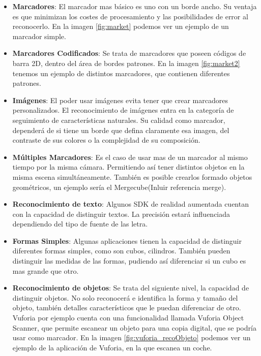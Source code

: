 \begin{itemize}
	\item \textbf{Marcadores}: El marcador mas básico es uno con un borde ancho. Su ventaja es que minimizan los costes de procesamiento y las posibilidades de error al reconocerlo. En la imagen \ref{fig:market} podemos ver un ejemplo de un marcador simple.\\		
	\item \textbf{Marcadores Codificados}:
	Se trata de marcadores que poseen códigos de barra 2D, dentro del área de bordes patrones. En la imagen \ref{fig:market2} tenemos un ejemplo de distintos marcadores, que contienen diferentes patrones.
	\item \textbf{Imágenes}:		
	El poder usar imágenes evita tener que crear marcadores personalizados. El reconocimiento de imágenes entra en la categoría de seguimiento de características naturales. Su calidad como marcador, dependerá de si tiene un borde que defina claramente esa imagen, del contraste de sus colores o la complejidad de su composición.
	\item \textbf{Múltiples Marcadores}:
	Es el caso de usar mas de un marcador al mismo tiempo por la misma cámara. Permitiendo así tener distintos objetos en la misma escena simultáneamente. También es posible crearlos formado objetos geométricos, un ejemplo sería el Mergecube(Inluir referencia merge).
	\item \textbf{Reconocimiento de texto}:
	Algunos SDK de realidad aumentada cuentan con la capacidad de distinguir textos. La precisión estará influenciada dependiendo del tipo de fuente de las letra. 
	\item \textbf{Formas Simples}:
	Algunas aplicaciones tienen la capacidad de distinguir diferentes formas simples, como son cubos, cilindros. También pueden distinguir las medidas de las formas, pudiendo así diferenciar si un cubo es mas grande que otro.
	\item \textbf{Reconocimiento de objetos}:		
	Se trata del siguiente nivel, la capacidad de distinguir objetos. No solo reconocerá e identifica la forma y tamaño del objeto, también detalles característicos que le puedan diferenciar de otro. Vuforia por ejemplo cuenta con una funcionalidad llamada Vuforia Object Scanner, que permite escanear un objeto para una copia digital, que se podría usar como marcador. En la imagen \ref{fig:vuforia_recoObjeto} podemos ver un ejemplo de la aplicación de Vuforia, en la que escanea un coche.  
	
\end{itemize}


